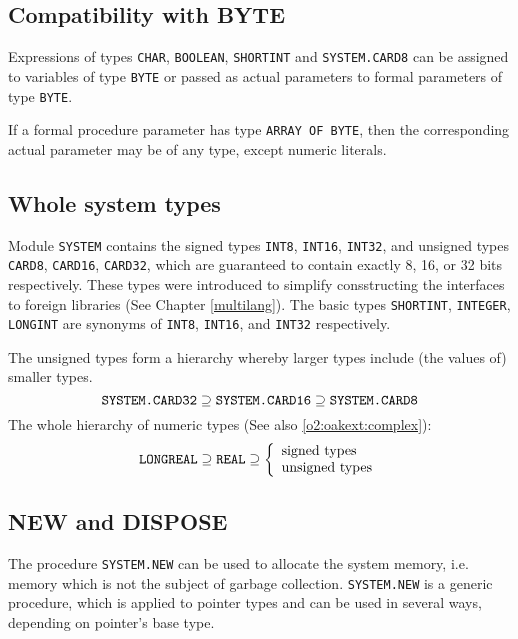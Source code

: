 \subsection{Compatibility with BYTE}

Expressions of types \verb'CHAR', \verb'BOOLEAN',
\verb'SHORTINT' and \verb'SYSTEM.CARD8' can
be assigned to variables of type \verb'BYTE' or passed as actual
parameters to formal parameters of type \verb'BYTE'.

If a formal procedure parameter has type \verb'ARRAY OF BYTE', then the
corresponding actual parameter may be of any type, except numeric
literals.

\subsection{Whole system types}\label{o2:fixed:size}

Module \verb'SYSTEM' contains the signed types \verb'INT8', \verb'INT16',
\verb'INT32', and unsigned types \verb'CARD8', \verb'CARD16', \verb'CARD32',
which are guaranteed to contain exactly 8, 16, or 32 bits respectively.
These types were introduced to simplify consstructing the interfaces
to foreign libraries (See Chapter \ref{multilang}).
The basic types \verb'SHORTINT', \verb'INTEGER', \verb'LONGINT'
are synonyms of \verb'INT8', \verb'INT16', and \verb'INT32' respectively.

The unsigned types form a hierarchy
whereby larger types include (the values of) smaller types.
$$
\mbox{{\tt SYSTEM.CARD32}} \supseteq
\mbox{{\tt SYSTEM.CARD16}} \supseteq
\mbox{{\tt SYSTEM.CARD8}}
$$
The whole hierarchy of numeric types (See also \ref{o2:oakext:complex}):
$$
\mbox{{\tt LONGREAL}} \supseteq \mbox{{\tt REAL}} \supseteq
\left \{
  \begin{array}{l}
     \mbox{signed types}        \\
     \mbox{unsigned types}      \\
  \end{array}
\right .
$$

\subsection{NEW and DISPOSE}\label{o2:system:new}

The procedure {\tt SYSTEM.NEW} can be used to allocate the system memory,
i.e. memory which is not the subject of garbage collection.
{\tt SYSTEM.NEW} is a generic procedure, which is applied to pointer types
and can be used in several ways, depending on pointer's base type.

